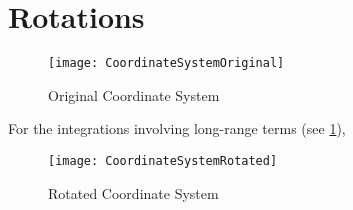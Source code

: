 \documentclass[Dissertation.tex]{subfiles}
\begin{document}
\section{Rotations}
\begin{figure}[H]
	\centering
	\texttt{[image: CoordinateSystemOriginal]}
	\caption{Original Coordinate System}
	\label{fig:CoordinateSystemOriginal}
\end{figure}

For the integrations involving long-range terms (see \ref{}), 

\begin{figure}[H]
	\centering
	\texttt{[image: CoordinateSystemRotated]}
	\caption{Rotated Coordinate System}
	\label{fig:CoordinateSystemRotated}
\end{figure}




\end{document}
